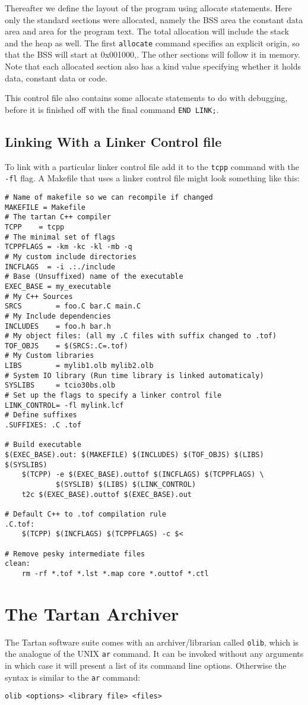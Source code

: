 Thereafter we define the layout of the program using allocate statements.
Here only the standard sections were allocated, namely the BSS area 
the constant data area and area for the program text. The total allocation
will include the stack and the heap as well. The first {\tt allocate} command
specifies an explicit origin, so that the BSS will start
at 0x001000,. The other sections will follow it in memory. Note that
each allocated section also has a kind value specifying whether it 
holds data, constant data or code.

This control file also contains some allocate statements to do with 
debugging, before it is finished off with the final command
{\tt END LINK;}.

\subsection{Linking With a Linker Control file}
To link with a particular linker control file add it to the {\tt tcpp} 
command with the {\tt -fl} flag. A Makefile that uses a linker control
file might look something like this:
{\scriptsize
\begin{verbatim}
# Name of makefile so we can recompile if changed
MAKEFILE = Makefile
# The tartan C++ compiler
TCPP	= tcpp
# The minimal set of flags
TCPPFLAGS = -km -kc -kl -mb -q
# My custom include directories
INCFLAGS  = -i .:./include
# Base (Unsuffixed) name of the executable 
EXEC_BASE = my_executable
# My C++ Sources
SRCS        = foo.C bar.C main.C
# My Include dependencies
INCLUDES    = foo.h bar.h
# My object files: (all my .C files with suffix changed to .tof) 
TOF_OBJS    = $(SRCS:.C=.tof)
# My Custom libraries
LIBS	    = mylib1.olb mylib2.olb
# System IO library (Run time library is linked automaticaly)
SYSLIBS     = tcio30bs.olb
# Set up the flags to specify a linker control file
LINK_CONTROL= -fl mylink.lcf
# Define suffixes
.SUFFIXES: .C .tof

# Build executable
$(EXEC_BASE).out: $(MAKEFILE) $(INCLUDES) $(TOF_OBJS) $(LIBS) $(SYSLIBS)
	$(TCPP) -e $(EXEC_BASE).outtof $(INCFLAGS) $(TCPPFLAGS) \
	        $(SYSLIB) $(LIBS) $(LINK_CONTROL)
	t2c $(EXEC_BASE).outtof $(EXEC_BASE).out

# Default C++ to .tof compilation rule
.C.tof:
	$(TCPP) $(INCFLAGS) $(TCPPFLAGS) -c $<

# Remove pesky intermediate files 
clean:
	rm -rf *.tof *.lst *.map core *.outtof *.ctl
\end{verbatim}}

\section{The Tartan Archiver}
The Tartan software suite comes with an archiver/librarian called {\tt olib},
which is the analogue of the UNIX {\tt ar} command. It can be invoked without
any arguments in which case it will present a list of its command line
options. Otherwise the syntax is similar to the {\tt ar} command:
\begin{center}
{\tt olib <options> <library file> <files>}
\end{center}

